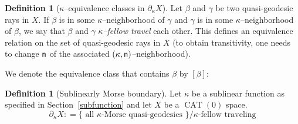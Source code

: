 \documentclass[12 pt]{amsart}
\theoremstyle{definition}
\newtheorem{definition}[theorem]{Definition}
\theoremstyle{remark}
\newcommand{\pka}{\partial_{\kappa}}
\newcommand{\nn}{{\sf n}}
\newcommand{\CAT}{\ensuremath{\operatorname{CAT}(0)}\xspace}
\begin{document}
\begin{definition}[$\kappa$--equivalence classes in $\pka X$] \label{Def:Fellow-Travel}
Let $\beta$ and $\gamma$ be two quasi-geodesic rays in $X$. If $\beta$ is in some 
$\kappa$--neighborhood of $\gamma$ and $\gamma$ is in some 
$\kappa$--neighborhood of $\beta$, we say that $\beta$ and $\gamma$ 
\emph{$\kappa$--fellow travel} each other. This defines an equivalence
relation on the set of quasi-geodesic rays in $X$ (to obtain transitivity, one needs to change $\nn$ of the associated $(\kappa, \nn)$--neighborhood). 
\end{definition}

We denote the equivalence class 
that contains $\beta$ by $[\beta]$:
\begin{definition}[Sublinearly Morse boundary]
Let $\kappa$ be a sublinear function as specified in Section~\ref{subfunction} and let $X$ be a \CAT space.
\[\pka X : = \{ \text{ all } \kappa\text{-Morse quasi-geodesics } \} / \kappa\text{-fellow traveling}\]
\end{definition}
\end{document}
